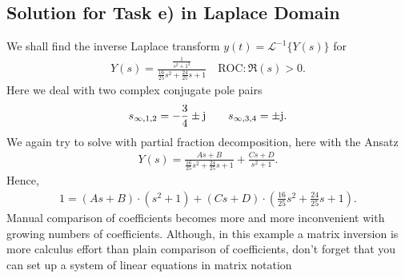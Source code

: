 \documentclass[a4paper,11pt,oneside]{scrartcl}
\begin{document}
\subsection{Solution for Task e) in Laplace Domain}
We shall find the inverse Laplace transform $y(t) = \mathcal{L}^{-1}\{Y(s)\}$
for
\begin{align}
Y(s) = \frac{\frac{1}{s^2 + 1^2}}{\frac{16}{25} s^2 + \frac{24}{25} s + 1}
\quad \text{ROC}: \Re(s) > 0.
\end{align}
Here we deal with two complex conjugate pole pairs
\begin{align}
s_{\infty,1,2} = -\frac{3}{4} \pm \im \qquad s_{\infty,3,4} = \pm \im.
\end{align}
We again try to solve with partial fraction decomposition, here with the Ansatz
\begin{align}
Y(s) = \frac{A s + B}{\frac{16}{25} s^2 + \frac{24}{25} s + 1}+
\frac{C s + D}{s^2+1}.
\end{align}
Hence,
\begin{align}
1=
(A s + B) \cdot (s^2+1)+
(C s + D) \cdot (\frac{16}{25} s^2 + \frac{24}{25} s + 1).
\end{align}
Manual comparison of coefficients becomes more and more inconvenient with growing
numbers of coefficients.
Although, in this example a matrix inversion is more calculus effort than plain
comparison of coefficients, don't forget that you can set up a system of linear
equations in matrix notation
\end{document}
